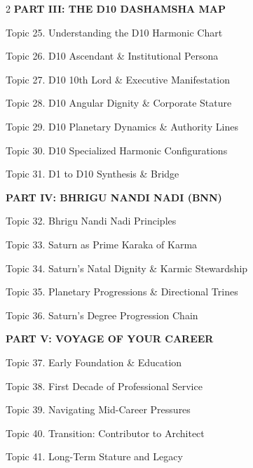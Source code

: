 \documentclass[10pt,oneside]{article}
\renewcommand{\textls}[2][60]{#2}
\begin{document}
\begin{multicols}{2}
  {\sffamily\fontsize{8.5}{11}\selectfont\bfseries\color{ExecutiveNavy}\textls[60]{PART III: THE D10 DASHAMSHA MAP}}\par
  \vspace{1mm}
  {\fontsize{8}{11.5}\selectfont
  Topic 25. Understanding the D10 Harmonic Chart \dotfill \pageref*{topic25}\par
  Topic 26. D10 Ascendant \& Institutional Persona \dotfill \pageref*{topic26}\par
  Topic 27. D10 10th Lord \& Executive Manifestation \dotfill \pageref*{topic27}\par
  Topic 28. D10 Angular Dignity \& Corporate Stature \dotfill \pageref*{topic28}\par
  Topic 29. D10 Planetary Dynamics \& Authority Lines \dotfill \pageref*{topic29}\par
  Topic 30. D10 Specialized Harmonic Configurations \dotfill \pageref*{topic30}\par
  Topic 31. D1 to D10 Synthesis \& Bridge \dotfill \pageref*{topic31}\par}
  \vspace{2.5mm}

  {\sffamily\fontsize{8.5}{11}\selectfont\bfseries\color{ExecutiveNavy}\textls[60]{PART IV: BHRIGU NANDI NADI (BNN)}}\par
  \vspace{1mm}
  {\fontsize{8}{11.5}\selectfont
  Topic 32. Bhrigu Nandi Nadi Principles \dotfill \pageref*{topic32}\par
  Topic 33. Saturn as Prime Karaka of Karma \dotfill \pageref*{topic33}\par
  Topic 34. Saturn's Natal Dignity \& Karmic Stewardship \dotfill \pageref*{topic34}\par
  Topic 35. Planetary Progressions \& Directional Trines \dotfill \pageref*{topic35}\par
  Topic 36. Saturn's Degree Progression Chain \dotfill \pageref*{topic36}\par}
  \vspace{2.5mm}

  {\sffamily\fontsize{8.5}{11}\selectfont\bfseries\color{ExecutiveNavy}\textls[60]{PART V: VOYAGE OF YOUR CAREER}}\par
  \vspace{1mm}
  {\fontsize{8}{11.5}\selectfont
  Topic 37. Early Foundation \& Education \dotfill \pageref*{topic37}\par
  Topic 38. First Decade of Professional Service \dotfill \pageref*{topic38}\par
  Topic 39. Navigating Mid-Career Pressures \dotfill \pageref*{topic39}\par
  Topic 40. Transition: Contributor to Architect \dotfill \pageref*{topic40}\par
  Topic 41. Long-Term Stature and Legacy \dotfill \pageref*{topic41}\par}
  \vspace{2.5mm}


\end{multicols}
\end{document}

